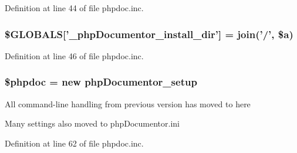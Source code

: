 \-Definition at line 44 of file phpdoc.\-inc.

\hypertarget{phpdoc_8inc_ae0c9701833ee906c21a6feb972ab268d}{
\subsubsection[{\$\-G\-L\-O\-B\-A\-L\-S}]{\setlength{\rightskip}{0pt plus 5cm}\$\-G\-L\-O\-B\-A\-L\-S\mbox{[}'\-\_\-php\-Documentor\-\_\-install\-\_\-dir'\mbox{]} = join('/', \${\bf a})}}\label{phpdoc_8inc_ae0c9701833ee906c21a6feb972ab268d}


\-Definition at line 46 of file phpdoc.\-inc.

\hypertarget{phpdoc_8inc_a1228ff819addc21a3136c1ae2664aa7a}{
\subsubsection[{\$phpdoc}]{\setlength{\rightskip}{0pt plus 5cm}\$phpdoc = new {\bf php\-Documentor\-\_\-setup}}}\label{phpdoc_8inc_a1228ff819addc21a3136c1ae2664aa7a}
\-All command-\/line handling from previous version has moved to here

\-Many settings also moved to php\-Documentor.\-ini 

\-Definition at line 62 of file phpdoc.\-inc.

